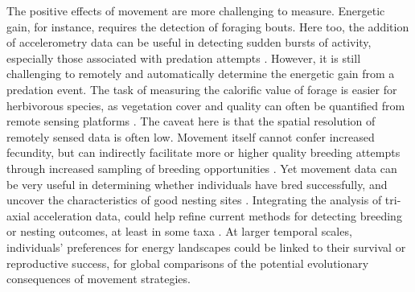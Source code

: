 The positive effects of movement are more challenging to measure.
Energetic gain, for instance, requires the detection of foraging bouts.
Here too, the addition of accelerometry data can be useful in detecting sudden bursts of activity, especially those associated with predation attempts \parencite{williams2014,bryce2017}.
However, it is still challenging to remotely and automatically determine the energetic gain from a predation event.
The task of measuring the calorific value of forage is easier for herbivorous species, as vegetation cover and quality can often be quantified from remote sensing platforms \parencite{pettorelli2011}.
The caveat here is that the spatial resolution of remotely sensed data is often low.
Movement itself cannot confer increased fecundity, but can indirectly facilitate more or higher quality breeding attempts through increased sampling of breeding opportunities \parencite[as in][]{kempenaers2017}.
Yet movement data can be very useful in determining whether individuals have bred successfully, and uncover the characteristics of good nesting sites \parencite{picardi2020}.
Integrating the analysis of tri-axial acceleration data, could help refine current methods for detecting breeding or nesting outcomes, at least in some taxa \parencite{schreven2021}.
At larger temporal scales, individuals' preferences for energy landscapes could be linked to their survival or reproductive success, for global comparisons of the potential evolutionary consequences of movement strategies.

{ \begin{center}  \end{center} }

